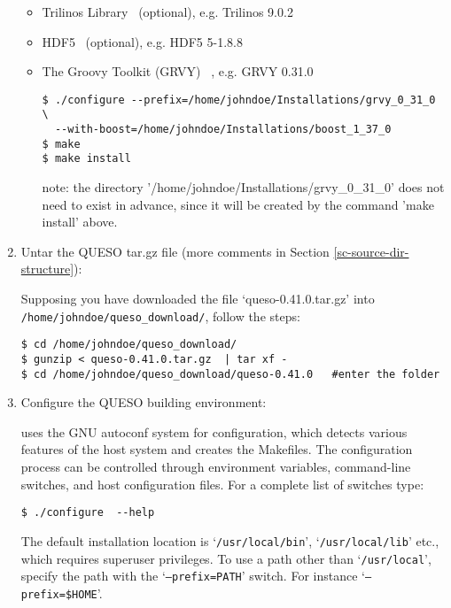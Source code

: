 \begin{enumerate}
{\begin{itemize}
\item Trilinos Library~\cite{Trilinos} (optional), e.g. Trilinos 9.0.2
\item HDF5~\cite{HDF5} (optional), e.g. HDF5  5-1.8.8 
\item{ The Groovy Toolkit (GRVY) ~\cite{grvy}, e.g. GRVY 0.31.0
\begin{verbatim}
$ ./configure --prefix=/home/johndoe/Installations/grvy_0_31_0 \
  --with-boost=/home/johndoe/Installations/boost_1_37_0
$ make 
$ make install
\end{verbatim}
note: the directory '/home/johndoe/Installations/grvy\_0\_31\_0' does not need to exist in advance, since it will be created by the command 'make install' above.
}
\end{itemize}
}
\item {Untar the QUESO tar.gz file (more comments in Section \ref{sc-source-dir-structure}): %

Supposing you have downloaded the file `queso-0.41.0.tar.gz' into \texttt{/home/johndoe/queso\_download/}, follow the steps:

\begin{verbatim}
$ cd /home/johndoe/queso_download/
$ gunzip < queso-0.41.0.tar.gz  | tar xf -
$ cd /home/johndoe/queso_download/queso-0.41.0   #enter the folder 
\end{verbatim}
}
\item {Configure the QUESO building environment: %

\Queso{} uses the GNU autoconf system for configuration, which detects various features of the host system and creates the Makefiles. %
%  
% 
The configuration process can be controlled through environment variables, command-line switches, and host configuration files.
For a complete list of switches type:
\begin{verbatim}
$ ./configure  --help       
\end{verbatim}
%
 The default installation location is `\texttt{/usr/local/bin}', `\texttt{/usr/local/lib}' etc., which requires superuser privileges. To use a path
        other than `\texttt{/usr/local}', specify the path with the `\texttt{--prefix=PATH}' switch. For instance `\texttt{--prefix=\$HOME}'.



}
\end{enumerate}
